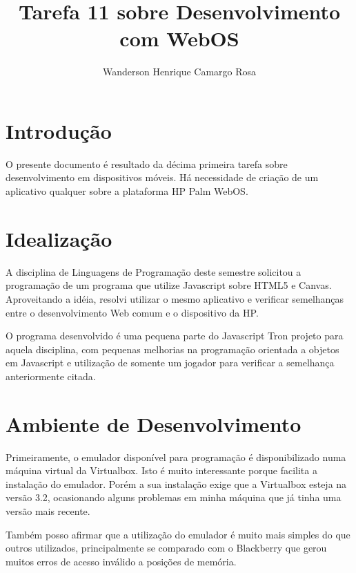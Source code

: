 \documentclass{article}
\title{Tarefa 11 sobre Desenvolvimento com WebOS}
\author{Wanderson Henrique Camargo Rosa\inst{1}}
\begin{document}
\maketitle{}

\section{Introdução}
\label{sec:introducao}

O presente documento é resultado da décima primeira tarefa sobre desenvolvimento
em dispositivos móveis. Há necessidade de criação de um aplicativo qualquer
sobre a plataforma HP Palm WebOS.

\section{Idealização}
\label{sec:idealizacao}

A disciplina de Linguagens de Programação deste semestre solicitou a programação
de um programa que utilize Javascript sobre HTML5 e Canvas. Aproveitando a
idéia, resolvi utilizar o mesmo aplicativo e verificar semelhanças entre o
desenvolvimento Web comum e o dispositivo da HP.

O programa desenvolvido é uma pequena parte do Javascript Tron projeto para
aquela disciplina, com pequenas melhorias na programação orientada a objetos em
Javascript e utilização de somente um jogador para verificar a semelhança
anteriormente citada.

\section{Ambiente de Desenvolvimento}
\label{sec:ambiente}

Primeiramente, o emulador disponível para programação é disponibilizado numa
máquina virtual da Virtualbox. Isto é muito interessante porque facilita a
instalação do emulador. Porém a sua instalação exige que a Virtualbox esteja na
versão 3.2, ocasionando alguns problemas em minha máquina que já tinha uma
versão mais recente.

Também posso afirmar que a utilização do emulador é muito mais simples do que
outros utilizados, principalmente se comparado com o Blackberry que gerou muitos
erros de acesso inválido a posições de memória.
\end{document}
